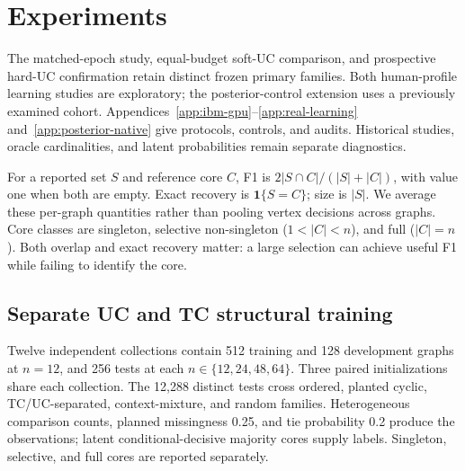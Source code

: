 



\section{Experiments}\label{sec:experiments}
The matched-epoch study, equal-budget soft-UC comparison, and prospective hard-UC confirmation retain distinct frozen primary families. Both human-profile learning studies are exploratory; the posterior-control extension uses a previously examined cohort. Appendices~\ref{app:ibm-gpu}--\ref{app:real-learning} and~\ref{app:posterior-native} give protocols, controls, and audits. Historical studies, oracle cardinalities, and latent probabilities remain separate diagnostics.

For a reported set $S$ and reference core $C$, F1 is $2|S\cap C|/(|S|+|C|)$, with value one when both are empty. Exact recovery is $\mathbf1\{S=C\}$; size is $|S|$. We average these per-graph quantities rather than pooling vertex decisions across graphs. Core classes are singleton, selective non-singleton ($1<|C|<n$), and full ($|C|=n$). Both overlap and exact recovery matter: a large selection can achieve useful F1 while failing to identify the core.

\begin{table}[t]\centering\scriptsize

\caption{Frozen primary contrasts under the same structural readout and development-selected cutoff. $\Delta$ is STE minus auxiliary F1; CI uses $t_{11}$ over twelve collection means, each averaging graphs and three initializations. Two-sided exhaustive sign-flip tests receive Holm adjustment over these three endpoints. Pos. counts positive collection effects.}
\label{tab:gpu-primary}\end{table}

\subsection{Separate UC and TC structural training}\label{sec:learning}
Twelve independent collections contain 512 training and 128 development graphs at $n=12$, and 256 tests at each $n\in\{12,24,48,64\}$. Three paired initializations share each collection. The 12,288 distinct tests cross ordered, planted cyclic, TC/UC-separated, context-mixture, and random families. Heterogeneous comparison counts, planned missingness 0.25, and tie probability 0.2 produce the observations; latent conditional-decisive majority cores supply labels. Singleton, selective, and full cores are reported separately.

